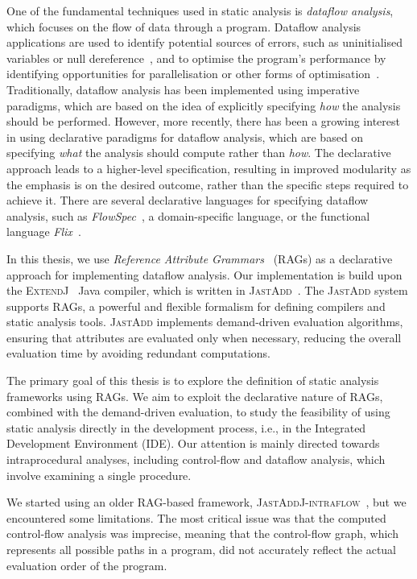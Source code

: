One of the fundamental techniques used in static analysis is \emph{dataflow analysis},
which focuses on the flow of data through a program. Dataflow analysis applications are used to identify
potential sources of errors, such as uninitialised variables or null dereference~\cite{khedker2017data},
and to optimise the program's performance by identifying opportunities for
parallelisation or other forms of optimisation~\cite{aho2007compilers}.
Traditionally, dataflow analysis has been implemented using imperative paradigms,
which are based on the idea of explicitly specifying \emph{how} the analysis should be
performed.
However, more recently, there has been a growing interest in using
declarative paradigms for dataflow analysis, which are based on specifying \emph{what}
the analysis should compute rather than \emph{how}.
The declarative approach leads to a higher-level specification, resulting in improved modularity as
the emphasis is on the desired outcome, rather than the specific steps required to
achieve it.
There are several declarative languages for specifying dataflow analysis,
such as \emph{FlowSpec}~\cite{smits2020flowspec}, a domain-specific language,
or the functional language \emph{Flix}~\cite{madsen2016programming}. 

In this thesis, we use \emph{Reference Attribute Grammars}~\cite{hedin2000rags} (RAGs)
as a declarative approach for implementing dataflow analysis.
Our implementation is build upon the \textsc{ExtendJ}~\cite{ekman2007jastadd} Java compiler,
which is written in \textsc{JastAdd}~\cite{DBLP:journals/entcs/HedinM01}.
The \textsc{JastAdd} system supports RAGs, a powerful and flexible
formalism for defining compilers and static analysis tools.
\textsc{JastAdd} implements demand-driven evaluation algorithms, ensuring that attributes are evaluated only
when necessary, reducing the overall evaluation time by avoiding redundant
computations.

The primary goal of this thesis is to explore the definition of static analysis
frameworks using RAGs.
We aim to exploit the declarative nature of RAGs,
combined with the demand-driven evaluation, to study the feasibility of using static
analysis directly in the development process, i.e., in the Integrated Development Environment (IDE).
Our attention is mainly directed towards intraprocedural analyses,
including control-flow and dataflow analysis, which involve examining a single procedure.

We started using an older RAG-based framework, \textsc{JastAddJ-intraflow}~\cite{10.1016/j.scico.2012.02.002},
but we encountered some limitations. The most critical issue was that the computed
control-flow analysis was imprecise, meaning that the
control-flow graph, which represents all possible paths in a program, did not
accurately reflect the actual evaluation order of the program.

